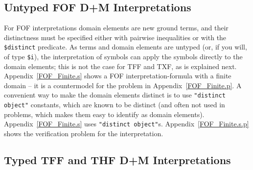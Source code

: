 \documentclass{easychair}
\begin{document}
\subsection{Untyped FOF {\sf D+M} Interpretations}
\label{NewTarskianFOF}

For FOF interpretations domain elements are new ground terms, and their distinctness must be 
specified either with pairwise inequalities or with the {\tt \$distinct} predicate.
As terms and domain elements are untyped (or, if you will, of type {\tt \$i}), the interpretation
of symbols can apply the symbols directly to the domain elements; this is not the case for
TFF and TXF, as is explained next.
Appendix~\ref{FOF_Finite.s} shows a FOF interpretation-formula with a finite domain -- it is a 
countermodel for the problem in Appendix~\ref{FOF_Finite.p}.
A convenient way to make the domain elements distinct is to use {\tt "distinct object"} constants, 
which are known to be distinct (and often not used in problems, which makes them easy to identify 
as domain elements).
Appendix~\ref{FOF_Finite.s} uses {\tt "distinct object"}s.
Appendix~\ref{FOF_Finite.s.p} shows the verification problem for the interpretation.

\subsection{Typed TFF and THF {\sf D+M} Interpretations}
\label{NewTarskianTFFTHF}
\end{document}
